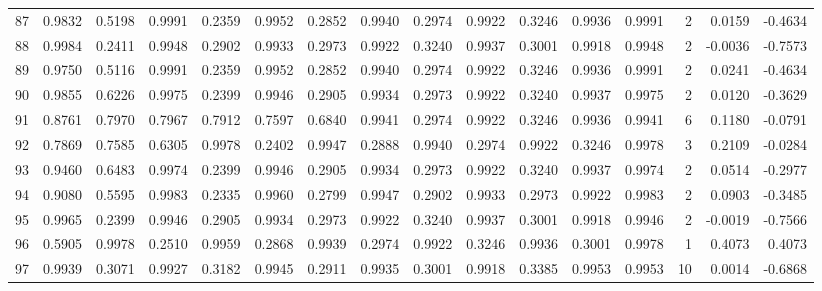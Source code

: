 \begin{tabular}{lrrrrrrrrrrrrrrr}
87  &      0.9832 &  0.5198 &  0.9991 &  0.2359 &  0.9952 &  0.2852 &  0.9940 &  0.2974 &  0.9922 &  0.3246 &   0.9936 &     0.9991 &      2 &                    0.0159 &                    -0.4634 \\
88  &      0.9984 &  0.2411 &  0.9948 &  0.2902 &  0.9933 &  0.2973 &  0.9922 &  0.3240 &  0.9937 &  0.3001 &   0.9918 &     0.9948 &      2 &                   -0.0036 &                    -0.7573 \\
89  &      0.9750 &  0.5116 &  0.9991 &  0.2359 &  0.9952 &  0.2852 &  0.9940 &  0.2974 &  0.9922 &  0.3246 &   0.9936 &     0.9991 &      2 &                    0.0241 &                    -0.4634 \\
90  &      0.9855 &  0.6226 &  0.9975 &  0.2399 &  0.9946 &  0.2905 &  0.9934 &  0.2973 &  0.9922 &  0.3240 &   0.9937 &     0.9975 &      2 &                    0.0120 &                    -0.3629 \\
91  &      0.8761 &  0.7970 &  0.7967 &  0.7912 &  0.7597 &  0.6840 &  0.9941 &  0.2974 &  0.9922 &  0.3246 &   0.9936 &     0.9941 &      6 &                    0.1180 &                    -0.0791 \\
92  &      0.7869 &  0.7585 &  0.6305 &  0.9978 &  0.2402 &  0.9947 &  0.2888 &  0.9940 &  0.2974 &  0.9922 &   0.3246 &     0.9978 &      3 &                    0.2109 &                    -0.0284 \\
93  &      0.9460 &  0.6483 &  0.9974 &  0.2399 &  0.9946 &  0.2905 &  0.9934 &  0.2973 &  0.9922 &  0.3240 &   0.9937 &     0.9974 &      2 &                    0.0514 &                    -0.2977 \\
94  &      0.9080 &  0.5595 &  0.9983 &  0.2335 &  0.9960 &  0.2799 &  0.9947 &  0.2902 &  0.9933 &  0.2973 &   0.9922 &     0.9983 &      2 &                    0.0903 &                    -0.3485 \\
95  &      0.9965 &  0.2399 &  0.9946 &  0.2905 &  0.9934 &  0.2973 &  0.9922 &  0.3240 &  0.9937 &  0.3001 &   0.9918 &     0.9946 &      2 &                   -0.0019 &                    -0.7566 \\
96  &      0.5905 &  0.9978 &  0.2510 &  0.9959 &  0.2868 &  0.9939 &  0.2974 &  0.9922 &  0.3246 &  0.9936 &   0.3001 &     0.9978 &      1 &                    0.4073 &                     0.4073 \\
97  &      0.9939 &  0.3071 &  0.9927 &  0.3182 &  0.9945 &  0.2911 &  0.9935 &  0.3001 &  0.9918 &  0.3385 &   0.9953 &     0.9953 &     10 &                    0.0014 &                    -0.6868 \\

\end{tabular}
